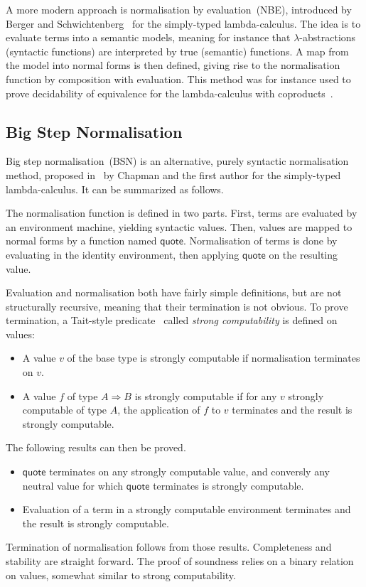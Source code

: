 \documentclass[a4paper,english]{lipics-v2019}
\newcommand{\agdaSymb}[1]{\mathsf{#1}}
\newcommand{\q}{\agdaSymb{quote}}
\newcommand{\Ra}{\Rightarrow}
\begin{document}
A more modern approach is normalisation by evaluation~(NBE), introduced
by Berger and Schwichtenberg~\cite{berger1991inverse} for the simply-typed
lambda-calculus. The idea is to evaluate terms into a semantic models,
meaning for instance that $\lambda$-abstractions (syntactic functions) are interpreted
by true (semantic) functions. A map from the model into normal forms is then
defined, giving rise to the normalisation function by composition with evaluation.
This method was for instance used to prove decidability of equivalence for the
lambda-calculus with coproducts~\cite{altenkirch2001normalization}.

\subsection{Big Step Normalisation}
Big step normalisation~(BSN) is an alternative, purely syntactic
normalisation method, proposed in~\cite{chapman2009bsn} by Chapman and the
first author for the simply-typed lambda-calculus. It can be summarized as
follows.

The normalisation function is defined in two parts. First, terms are
evaluated by an environment machine, yielding syntactic values. Then, values are
mapped to normal forms by a function named $\q$. Normalisation of terms is done
by evaluating in the identity environment, then applying $\q$ on the resulting value.

Evaluation and normalisation both have fairly simple definitions, but are
not structurally recursive, meaning that their termination is not obvious.
To prove termination, a Tait-style predicate~\cite{tait1967} called
\emph{strong computability} is defined on values:
\begin{itemize}
\item A value $v$ of the base type is strongly computable if normalisation
  terminates on $v$.
\item A value $f$ of type $A \Ra B$ is strongly computable if for any $v$ strongly
  computable of type $A$, the application of $f$ to $v$ terminates and the
  result is strongly computable.
\end{itemize}
The following results can then be proved.
\begin{itemize}
\item $\q$ terminates on any strongly computable value, and conversly any
  neutral value for which $\q$ terminates is strongly computable.
\item Evaluation of a term in a strongly computable environment terminates
  and the result is strongly computable.
\end{itemize}
Termination of normalisation follows from those results. Completeness and
stability are straight forward. The proof of soundness relies on a binary
relation on values, somewhat similar to strong computability.
\end{document}
